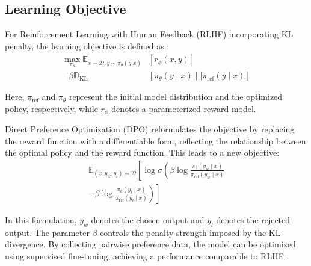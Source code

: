 
\subsection{Learning Objective}

For Reinforcement Learning with Human Feedback (RLHF) incorporating KL penalty, the learning objective is defined as \citep{ouyang2022rlhf}:
\begin{align*}
\max_{\pi_{\theta}}\mathbb{E}_{x\sim\mathcal{D},y\sim\pi_{\theta}(y|x)} & \left[r_{\phi}(x,y)\right] \\
 -\beta\mathbb{D}_{\mathrm{KL}} & \left[\pi_{\theta}(y\mid x)\mid\mid\pi_{\mathrm{ref}}(y\mid x)\right]
\end{align*}

Here, $\pi_{\mathrm{ref}}$ and $\pi_{\theta}$ represent the initial model distribution and the optimized policy, respectively, while $r_{\phi}$ denotes a parameterized reward model.

Direct Preference Optimization (DPO) reformulates the objective by replacing the reward function with a differentiable form, reflecting the relationship between the optimal policy and the reward function. This leads to a new objective:
\begin{align*}
\mathbb{E}_{(x,y_{w},y_{l})\sim\mathcal{D}}\left[\log \sigma\left(\beta \log\frac{\pi_{\theta}(y_{w}\mid x)}{\pi_{\mathrm{ref}}(y_{w}\mid x)}\right.\right. \\
\left.\left.  -\beta\log\frac{\pi_{\theta}(y_{l}\mid x)}{\pi_{\mathrm{ref}}(y_{l}\mid x)} \right)\right]
\end{align*}


In this formulation, $y_w$ denotes the chosen output and $y_l$ denotes the rejected output. The parameter $\beta$ controls the penalty strength imposed by the KL divergence. By collecting pairwise preference data, the model can be optimized using supervised fine-tuning, achieving a performance comparable to RLHF \citep{rafailov2024dpo}.

